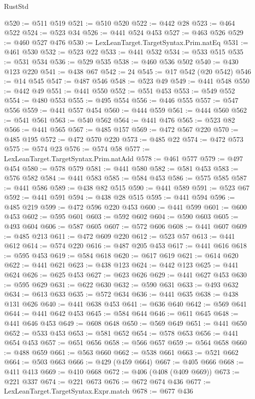 \begin{lexlean}{RustStd}
\begin{coremodule}
{\begin{coremodule}
{{{{{{{{{{{{{{{{{{{{{{{{{@520 := @511 @519
@521 := @510 @520
@522 := @442 @28
@523 := @464 @522
@524 := @523 @34
@526 := @441 @524 @453
@527 := @463 @526
@529 := @460 @527 @476
@530 := LexLeanTarget.TargetSyntax.Prim.natEq
@531 := @461 @530
@532 := @523 @22
@533 := @441 @532
@534 := @533 @515
@535 := @531 @534
@536 := @529 @535
@538 := @460 @536 @502
@540 := @430 @123 @220
@541 := @438 @67
@542 := 24
@545 := @17 @542 (@20 @542)
@546 := @14 @545
@547 := @487 @546
@548 := @523 @49
@549 := @441 @548
@550 := @442 @49
@551 := @441 @550
@552 := @551 @453
@553 := @549 @552
@554 := @480 @553
@555 := @495 @554
@556 := @446 @555
@557 := @547 @556
@559 := @441 @557 @454
@560 := @444 @559
@561 := @444 @560
@562 := @541 @561
@563 := @540 @562
@564 := @441 @476
@565 := @523 @82
@566 := @441 @565
@567 := @485 @157
@569 := @472 @567 @220
@570 := @485 @195
@572 := @472 @570 @220
@573 := @485 @22
@574 := @472 @573
@575 := @574 @23
@576 := @574 @58
@577 := LexLeanTarget.TargetSyntax.Prim.natAdd
@578 := @461 @577
@579 := @497 @454
@580 := @578 @579
@581 := @441 @580
@582 := @581 @453
@583 := @576 @582
@584 := @441 @583
@585 := @584 @453
@586 := @575 @585
@587 := @441 @586
@589 := @438 @82 @515
@590 := @441 @589
@591 := @523 @67
@592 := @441 @591
@594 := @438 @28 @515
@595 := @441 @594
@596 := @485 @219
@599 := @472 @596 @220 @453
@600 := @441 @599
@601 := @600 @453
@602 := @595 @601
@603 := @592 @602
@604 := @590 @603
@605 := @493 @604
@606 := @587 @605
@607 := @572 @606
@608 := @441 @607
@609 := @485 @213
@611 := @472 @609 @220
@612 := @523 @57
@613 := @441 @612
@614 := @574 @220
@616 := @487 @205 @453
@617 := @441 @616
@618 := @595 @453
@619 := @584 @618
@620 := @617 @619
@621 := @614 @620
@622 := @441 @621
@623 := @438 @123
@624 := @442 @123
@625 := @441 @624
@626 := @625 @453
@627 := @623 @626
@629 := @441 @627 @453
@630 := @595 @629
@631 := @622 @630
@632 := @590 @631
@633 := @493 @632
@634 := @613 @633
@635 := @572 @634
@636 := @441 @635
@638 := @438 @131 @626
@640 := @441 @638 @453
@641 := @636 @640
@642 := @569 @641
@644 := @441 @642 @453
@645 := @584 @644
@646 := @611 @645
@648 := @441 @646 @453
@649 := @608 @648
@650 := @569 @649
@651 := @441 @650
@652 := @533 @453
@653 := @581 @652
@654 := @578 @653
@656 := @441 @654 @453
@657 := @651 @656
@658 := @566 @657
@659 := @564 @658
@660 := @488 @659
@661 := @563 @660
@662 := @538 @661
@663 := @521 @662
@664 := @503 @663
@666 := @429 (@459 @664)
@667 := @405 @666
@668 := @411 @413
@669 := @410 @668
@672 := @406 (@408 (@409 @669))
@673 := @221 @337
@674 := @221 @673
@676 := @672 @674 @436
@677 := LexLeanTarget.TargetSyntax.Expr.match
@678 := @677 @436
}}}}}}}}}}}}}}}}}}}}}}}}}
\end{coremodule}}
\end{coremodule}
\end{lexlean}
